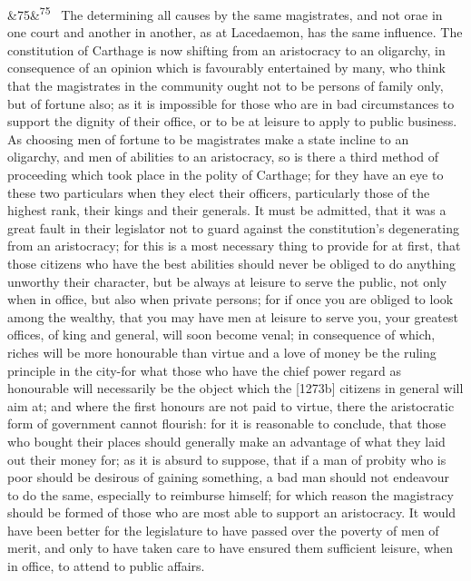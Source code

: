 \documentclass[12pt]{article}
\newcommand{\para}[1][]{\par\noindent\ifx&#1&\else\textsuperscript{\footnotesize #1}~\fi}
\begin{document}
\para[75] The determining all causes by the same magistrates, and not orae in one court and another in another, as at Lacedaemon, has the same influence. The constitution of Carthage is now shifting from an aristocracy to an oligarchy, in consequence of an opinion which is favourably entertained by many, who think that the magistrates in the community ought not to be persons of family only, but of fortune also; as it is impossible for those who are in bad circumstances to support the dignity of their office, or to be at leisure to apply to public business. As choosing men of fortune to be magistrates make a state incline to an oligarchy, and men of abilities to an aristocracy, so is there a third method of proceeding which took place in the polity of Carthage; for they have an eye to these two particulars when they elect their officers, particularly those of the highest rank, their kings and their generals. It must be admitted, that it was a great fault in their legislator not to guard against the constitution's degenerating from an aristocracy; for this is a most necessary thing to provide for at first, that those citizens who have the best abilities should never be obliged to do anything unworthy their character, but be always at leisure to serve the public, not only when in office, but also when private persons; for if once you are obliged to look among the wealthy, that you may have men at leisure to serve you, your greatest offices, of king and general, will soon become venal; in consequence of which, riches will be more honourable than virtue and a love of money be the ruling principle in the city-for what those who have the chief power regard as honourable will necessarily be the object which the [1273b] citizens in general will aim at; and where the first honours are not paid to virtue, there the aristocratic form of government cannot flourish: for it is reasonable to conclude, that those who bought their places should generally make an advantage of what they laid out their money for; as it is absurd to suppose, that if a man of probity who is poor should be desirous of gaining something, a bad man should not endeavour to do the same, especially to reimburse himself; for which reason the magistracy should be formed of those who are most able to support an aristocracy. It would have been better for the legislature to have passed over the poverty of men of merit, and only to have taken care to have ensured them sufficient leisure, when in office, to attend to public affairs.
\end{document}
